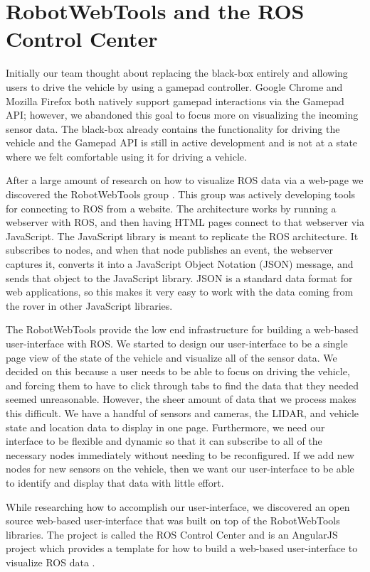 \section{RobotWebTools and the ROS Control Center}Initially our team thought about replacing the black-box entirely and allowing users to drive the vehicle by using a gamepad controller.  Google Chrome and Mozilla Firefox both natively support gamepad interactions via the Gamepad API; however, we abandoned this goal to focus more on visualizing the incoming sensor data.  The black-box already contains the functionality for driving the vehicle and the Gamepad API is still in active development and is not at a state where we felt comfortable using it for driving a vehicle.

After a large amount of research on how to visualize ROS data via a web-page we discovered the RobotWebTools group \cite{robotwebtools}. This group was actively developing tools for connecting to ROS from a website.  The architecture works by running a webserver with ROS, and then having HTML pages connect to that webserver via JavaScript.  The JavaScript library is meant to replicate the ROS architecture.  It subscribes to nodes, and when that node publishes an event, the webserver captures it, converts it into a JavaScript Object Notation (JSON) message, and sends that object to the JavaScript library.  JSON is a standard data format for web applications, so this makes it very easy to work with the data coming from the rover in other JavaScript libraries.


The RobotWebTools provide the low end infrastructure for building a web-based user-interface with ROS.  We started to design our user-interface to be a single page view of the state of the vehicle and visualize all of the sensor data.  We decided on this because a user needs to be able to focus on driving the vehicle, and forcing them to have to click through tabs to find the data that they needed seemed unreasonable.  However, the sheer amount of data that we process makes this difficult.  We have a handful of sensors and cameras, the LIDAR, and vehicle state and location data to display in one page.  Furthermore, we need our interface to be flexible and dynamic so that it can subscribe to all of the necessary nodes immediately without needing to be reconfigured.  If we add new nodes for new sensors on the vehicle, then we want our user-interface to be able to identify and display that data with little effort.

While researching how to accomplish our user-interface, we discovered an open source web-based user-interface that was built on top of the RobotWebTools libraries.  The project is called the ROS Control Center and is an AngularJS project which provides a template for how to build a web-based user-interface to visualize ROS data \cite{roscontrolcenter}.

